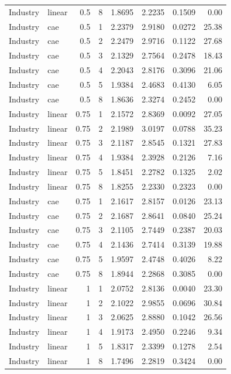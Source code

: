 \begin{longtable}{llrrrrrr}
Industry & linear & 0.5 & 8 & 1.8695 & 2.2235 & 0.1509 & 0.00 \\
Industry & cae & 0.5 & 1 & 2.2379 & 2.9180 & 0.0272 & 25.38 \\
Industry & cae & 0.5 & 2 & 2.2479 & 2.9716 & 0.1122 & 27.68 \\
Industry & cae & 0.5 & 3 & 2.1329 & 2.7564 & 0.2478 & 18.43 \\
Industry & cae & 0.5 & 4 & 2.2043 & 2.8176 & 0.3096 & 21.06 \\
Industry & cae & 0.5 & 5 & 1.9384 & 2.4683 & 0.4130 & 6.05 \\
Industry & cae & 0.5 & 8 & 1.8636 & 2.3274 & 0.2452 & 0.00 \\
Industry & linear & 0.75 & 1 & 2.1572 & 2.8369 & 0.0092 & 27.05 \\
Industry & linear & 0.75 & 2 & 2.1989 & 3.0197 & 0.0788 & 35.23 \\
Industry & linear & 0.75 & 3 & 2.1187 & 2.8545 & 0.1321 & 27.83 \\
Industry & linear & 0.75 & 4 & 1.9384 & 2.3928 & 0.2126 & 7.16 \\
Industry & linear & 0.75 & 5 & 1.8451 & 2.2782 & 0.1325 & 2.02 \\
Industry & linear & 0.75 & 8 & 1.8255 & 2.2330 & 0.2323 & 0.00 \\
Industry & cae & 0.75 & 1 & 2.1617 & 2.8157 & 0.0126 & 23.13 \\
Industry & cae & 0.75 & 2 & 2.1687 & 2.8641 & 0.0840 & 25.24 \\
Industry & cae & 0.75 & 3 & 2.1105 & 2.7449 & 0.2387 & 20.03 \\
Industry & cae & 0.75 & 4 & 2.1436 & 2.7414 & 0.3139 & 19.88 \\
Industry & cae & 0.75 & 5 & 1.9597 & 2.4748 & 0.4026 & 8.22 \\
Industry & cae & 0.75 & 8 & 1.8944 & 2.2868 & 0.3085 & 0.00 \\
Industry & linear & 1 & 1 & 2.0752 & 2.8136 & 0.0040 & 23.30 \\
Industry & linear & 1 & 2 & 2.1022 & 2.9855 & 0.0696 & 30.84 \\
Industry & linear & 1 & 3 & 2.0625 & 2.8880 & 0.1042 & 26.56 \\
Industry & linear & 1 & 4 & 1.9173 & 2.4950 & 0.2246 & 9.34 \\
Industry & linear & 1 & 5 & 1.8317 & 2.3399 & 0.1278 & 2.54 \\
Industry & linear & 1 & 8 & 1.7496 & 2.2819 & 0.3424 & 0.00 \\

\end{longtable}

